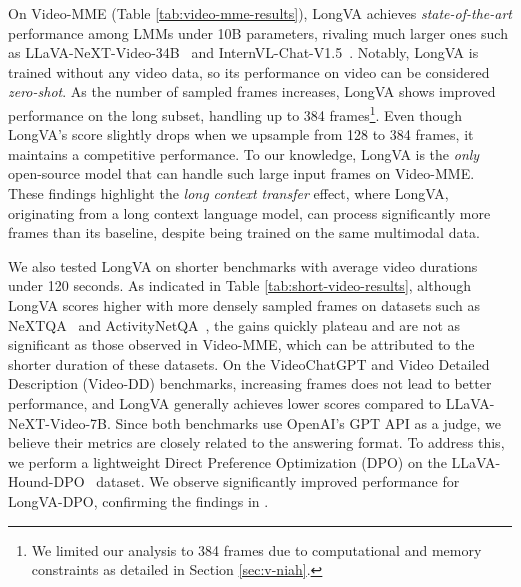 On Video-MME (Table \ref{tab:video-mme-results}), LongVA achieves \textit{state-of-the-art} performance among LMMs under 10B parameters, rivaling much larger ones such as LLaVA-NeXT-Video-34B~\citep{zhang2024llavanextvideo} and InternVL-Chat-V1.5~\citep{chen2023internvl}. Notably, LongVA is trained without any video data, so its performance on video can be considered \textit{zero-shot}. As the number of sampled frames increases, LongVA shows improved performance on the long subset, handling up to 384 frames\footnote{We limited our analysis to 384 frames due to computational and memory constraints as detailed in Section \ref{sec:v-niah}.}.  Even though LongVA's score slightly drops when we upsample from 128 to 384 frames, it maintains a competitive performance. To our knowledge, LongVA is the \textit{only} open-source model that can handle such large input frames on Video-MME.
These findings highlight the \textit{long context transfer} effect, where LongVA, originating from a long context language model, can process significantly more frames than its baseline, despite being trained on the same multimodal data.

We also tested LongVA on shorter benchmarks with average video durations under 120 seconds.  As indicated in Table \ref{tab:short-video-results}, although LongVA scores higher with more densely sampled frames on datasets such as NeXTQA~\citep{xiao2021nextqanext} and ActivityNetQA~\citep{yu2019activitynetqa}, the gains quickly plateau and are not as significant as those observed in Video-MME, which can be attributed to the shorter duration of these datasets.  On the VideoChatGPT and Video Detailed Description (Video-DD) benchmarks, increasing frames does not lead to better performance, and LongVA generally achieves lower scores compared to LLaVA-NeXT-Video-7B. 
Since both benchmarks use OpenAI's GPT API as a judge, we believe their metrics are closely related to the answering format. To address this, we perform a lightweight Direct Preference Optimization (DPO) on the LLaVA-Hound-DPO~\citep{zhang2024direct} dataset. We observe significantly improved performance for LongVA-DPO, confirming the findings in \cite{zhang2024direct}.

